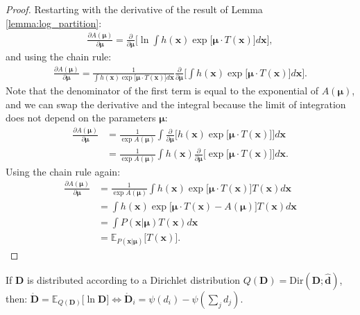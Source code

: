 \documentclass[twoside,11pt]{article}
\begin{document}
\begin{proof}
Restarting with the derivative of the result of Lemma \ref{lemma:log_partition}:
\begin{align}
\frac{\partial A(\bm{\mu})}{\partial \bm{\mu}} = \frac{\partial}{\partial \bm{\mu}} \Bigg[ \ln \int h(\bm{x})\exp \Big[\bm{\mu} \cdot T(\bm{x}) \Big] d\bm{x} \Bigg],
\end{align}
and using the chain rule:
\begin{align}
\frac{\partial A(\bm{\mu})}{\partial \bm{\mu}} = \frac{1}{\int h(\bm{x})\exp\big[\bm{\mu} \cdot T(\bm{x}) \big] d\bm{x}} \frac{\partial}{\partial \bm{\mu}} \Bigg[ \int h(\bm{x})\exp \Big[\bm{\mu} \cdot T(\bm{x}) \Big] d\bm{x} \Bigg].
\end{align}
Note that the denominator of the first term is equal to the exponential of $A(\bm{\mu})$, and we can swap the derivative and the integral because the limit of integration does not depend on the parameters $\bm{\mu}$:
\begin{align}
\frac{\partial A(\bm{\mu})}{\partial \bm{\mu}} &= \frac{1}{\exp A(\bm{\mu})} \int \frac{\partial}{\partial \bm{\mu}} \bigg[ h(\bm{x})\exp \Big[\bm{\mu} \cdot T(\bm{x}) \Big] \bigg] d\bm{x}\\
&= \frac{1}{\exp A(\bm{\mu})} \int h(\bm{x}) \frac{\partial}{\partial \bm{\mu}} \bigg[ \exp \Big[\bm{\mu} \cdot T(\bm{x}) \Big] \bigg] d\bm{x}.
\end{align}
Using the chain rule again:
\begin{align}
\frac{\partial A(\bm{\mu})}{\partial \bm{\mu}} &= \frac{1}{\exp A(\bm{\mu})} \int h(\bm{x}) \exp \Big[\bm{\mu} \cdot T(\bm{x}) \Big] T(\bm{x}) d\bm{x}\\
&= \int h(\bm{x}) \exp \Big[\bm{\mu} \cdot T(\bm{x}) - A(\bm{\mu}) \Big] T(\bm{x}) d\bm{x}\\
&= \int P(\bm{x}|\bm{\mu}) T(\bm{x}) d\bm{x}\\
&= \mathbb{E}_{P(\bm{x}|\bm{\mu})} \Big[ T(\bm{x}) \Big].
\end{align}
\end{proof}

\begin{theorem}
If $\bm{D}$ is distributed according to a Dirichlet distribution $Q(\bm{D}) = \text{Dir}(\bm{D};\bm{\hat{d}})$, then:
$\bm{\mathring{D}} = \mathbb{E}_{Q(\bm{D})}\big[ \ln \bm{D} \big] \Leftrightarrow \bm{\mathring{D}}_i = \psi(d_i) - \psi(\sum_j d_j).$
\end{theorem}
\end{document}
